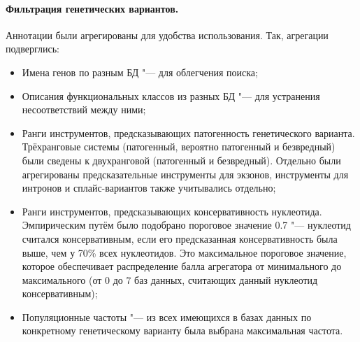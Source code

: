 \documentclass[a4paper,12pt]{article}
\begin{document}
\paragraph{Фильтрация генетических вариантов.}
Аннотации были агрегированы для удобства использования.
Так, агрегации подверглись:

\begin{itemize}
\item Имена генов по разным БД "--- для облегчения поиска;
\item Описания функциональных классов из разных БД "--- для устранения несоответствий между ними;
\item Ранги инструментов, предсказывающих патогенность генетического варианта.
Трёхранговые системы (патогенный, вероятно патогенный и безвредный) были сведены к двухранговой (патогенный и безвредный).
Отдельно были агрегированы предсказательные инструменты для экзонов, инструменты для интронов и сплайс-вариантов также учитывались отдельно;
\item Ранги инструментов, предсказывающих консервативность нуклеотида.
Эмпирическим путём было подобрано пороговое значение 0.7 "--- нуклеотид считался консервативным, если его предсказанная консервативность была выше, чем у 70\% всех нуклеотидов.
Это максимальное пороговое значение, которое обеспечивает распределение балла агрегатора от минимального до максимального (от 0 до 7 баз данных, считающих данный нуклеотид консервативным);
\item Популяционные частоты "--- из всех имеющихся в базах данных по конкретному генетическому варианту была выбрана максимальная частота.
\end{itemize}
\end{document}
